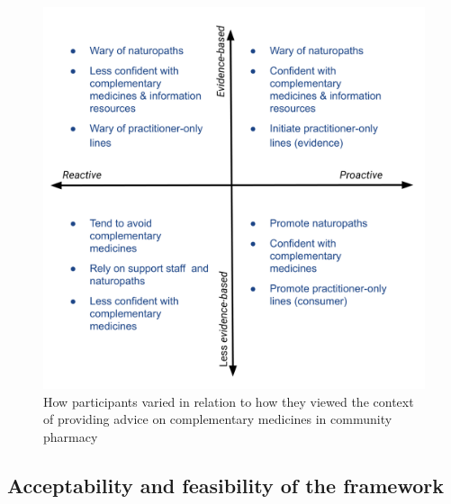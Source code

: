 \documentclass[11pt,a4paper]{article}
\begin{document}
\begin{figure}
\centering
\includegraphics{fig_tab/fig_context.png}
\caption{How participants varied in relation to how they viewed the
context of providing advice on complementary medicines in community
pharmacy}
\end{figure}

\subsection{Acceptability and feasibility of the
framework}\label{acceptability-and-feasibility-of-the-framework}

\printbibliography[title=References]
\end{document}
